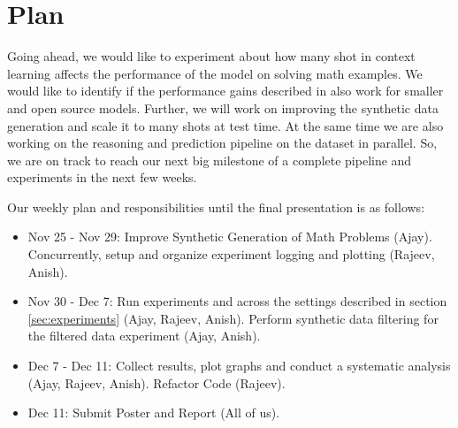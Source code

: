 \documentclass[twocolumn,11pt]{article}
\begin{document}
\section{Plan}
Going ahead, we would like to experiment about how many shot in context learning affects the performance of the model on solving math examples. We would like to identify  if the performance gains described in \cite{agarwal2024manyshotincontextlearning} also work for smaller and open source models. Further, we will work on improving the synthetic data generation and scale it to many shots at test time. At the same time we are also working on the reasoning and prediction pipeline on the dataset in parallel. So, we are on track to reach our next big milestone of a complete pipeline and experiments in the next few weeks. 

Our weekly plan and responsibilities until the final presentation is as follows:
\begin{itemize}
    \item Nov 25 - Nov 29: Improve Synthetic Generation of Math Problems (Ajay). Concurrently, setup and organize experiment logging and plotting (Rajeev, Anish).
    \item Nov 30 - Dec 7: Run experiments and across the settings described in section \ref{sec:experiments} (Ajay, Rajeev, Anish). Perform synthetic data filtering for the filtered data experiment (Ajay, Anish).
    \item Dec 7 - Dec 11: Collect results, plot graphs and conduct a systematic analysis (Ajay, Rajeev, Anish). Refactor Code (Rajeev).
    \item Dec 11: Submit Poster and Report (All of us).
\end{itemize}



\end{document}
